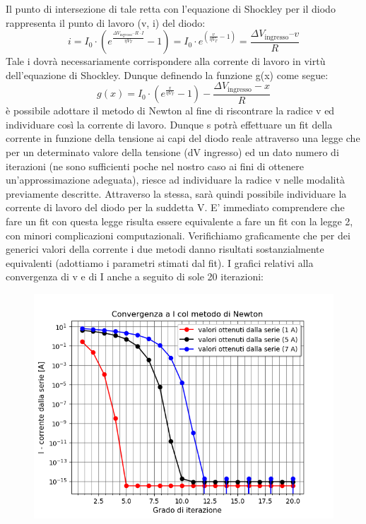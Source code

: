 \documentclass{article}[a4paper, oneside, 11pt]
\begin{document}
Il punto di intersezione di tale retta con l’equazione di Shockley per il diodo rappresenta il punto di lavoro (v, i) del diodo:
\begin{equation}
i = I_0 \cdot ( e^{\frac {\Delta V_{\text{ingresso}} – R \cdot I}{\eta V_T} } - 1) = I_0 \cdot e^({\frac{v} {\eta V_T}} -1) =  \frac{\Delta V_{\text{ingresso}} – v}{R}
\end{equation}
Tale i dovrà necessariamente corrispondere alla corrente di lavoro in virtù dell’equazione di Shockley. Dunque definendo la funzione g(x) come segue:
\begin{equation}\label{eq: invsck}
g(x) = I_0 \cdot ( e^{\frac{x}{\eta V_T}} - 1)  - \frac {\Delta V_{\text{ingresso}} - x}{R}
\end{equation}
è possibile adottare il metodo di Newton al fine di riscontrare la radice v ed individuare così la corrente di lavoro. 
Dunque s potrà effettuare un fit della corrente in funzione della tensione ai capi del diodo reale attraverso una legge che per un determinato valore della tensione (dV ingresso) ed un dato numero di iterazioni (ne sono sufficienti poche nel nostro caso ai fini di ottenere un’approssimazione adeguata), riesce ad individuare la radice v  nelle modalità previamente descritte. Attraverso la stessa, sarà quindi possibile individuare la corrente di lavoro del diodo per la suddetta V. 
E’ immediato comprendere che fare un fit con questa legge risulta essere equivalente a fare un fit con la legge 2, con minori complicazioni computazionali. Verifichiamo graficamente che per dei generici valori della corrente  i due metodi danno risultati sostanzialmente equivalenti (adottiamo i parametri stimati dal fit). I grafici relativi alla convergenza di v e di I anche a seguito di sole 20 iterazioni:
\begin{figure}[H]
	\centering 
 		\includegraphics[scale=0.75]{./Figura2_appendiceB.png}
\end{figure}
\end{document}
